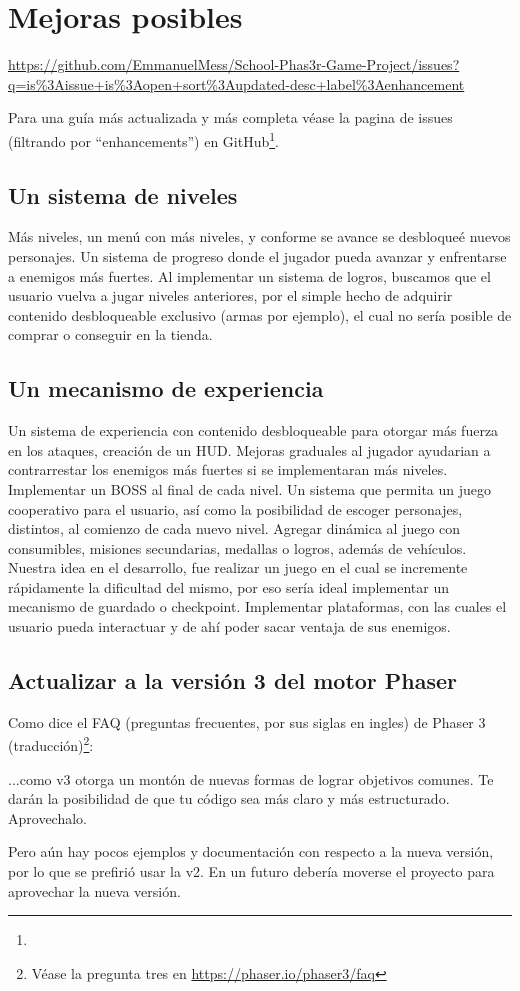 \documentclass{article}
\begin{document}
   	\section*{Mejoras posibles}
   	\urldef\inserturl\url{https://github.com/EmmanuelMess/School-Phas3r-Game-Project/issues?q=is%3Aissue+is%3Aopen+sort%3Aupdated-desc+label%3Aenhancement}
   		
	Para una guía más actualizada y más completa véase la pagina de issues (filtrando por ``enhancements'') en GitHub\footnote{\inserturl}.
	
   	\subsection*{Un sistema de niveles}
	
	Más niveles, un menú con más niveles, y conforme se avance se desbloqueé nuevos personajes. Un sistema de progreso donde el jugador pueda avanzar y enfrentarse a enemigos más fuertes. Al implementar un sistema de logros, buscamos que el usuario vuelva a jugar niveles anteriores, por el simple hecho de adquirir contenido desbloqueable exclusivo (armas por ejemplo), el cual no sería posible de comprar o conseguir en la tienda.
	
	\subsection*{Un mecanismo de experiencia}
	
	Un sistema de experiencia con contenido desbloqueable para otorgar más fuerza en los ataques, creación de un HUD. Mejoras graduales al jugador ayudarian a contrarrestar los enemigos más fuertes si se implementaran más niveles. Implementar un BOSS al final de cada nivel.
	Un sistema que permita un juego cooperativo para el usuario, así como la posibilidad de escoger personajes, distintos, al comienzo de cada nuevo nivel. 
	Agregar dinámica al juego con consumibles, misiones secundarias, medallas o logros, además de vehículos. Nuestra idea en el desarrollo, fue realizar un juego en el cual se incremente rápidamente la dificultad del mismo, por eso sería ideal implementar un mecanismo de guardado o checkpoint.
	Implementar plataformas, con las cuales el usuario pueda interactuar y de ahí poder sacar ventaja de sus enemigos.
	
	\subsection*{Actualizar a la versión 3 del motor Phaser}
	
	Como dice el FAQ (preguntas frecuentes, por sus siglas en ingles) de Phaser 3 (traducción)\footnote{Véase la pregunta tres en \url{https://phaser.io/phaser3/faq}}:
	\begin{displayquote}
	 	...como v3 otorga un montón de nuevas formas de lograr objetivos comunes. Te darán la posibilidad de que tu código sea más claro y más estructurado. Aprovechalo.
	\end{displayquote}
	
	Pero aún hay pocos ejemplos y documentación con respecto a la nueva versión, por lo que se prefirió usar la v2. En un futuro debería moverse el proyecto para aprovechar la nueva versión.
\end{document}
